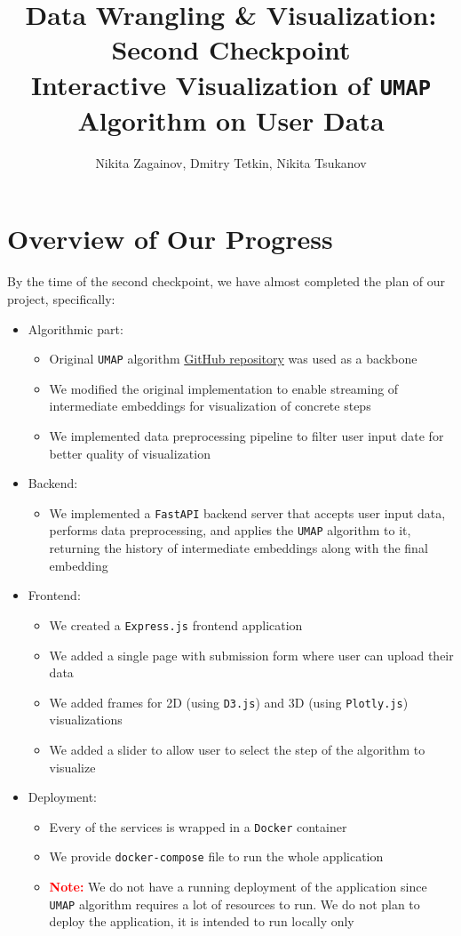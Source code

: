 \documentclass{article}
\title{Data Wrangling \& Visualization: Second Checkpoint \\
 \textbf{Interactive Visualization of \texttt{UMAP} Algorithm on User Data}}
\author{Nikita Zagainov, Dmitry Tetkin, Nikita Tsukanov}
\date{\monthname[\the\month] \the\year}
\begin{document}
\maketitle

\section{Overview of Our Progress}

By the time of the second checkpoint, we have almost completed the plan of our project, specifically:
\begin{itemize}
	\item Algorithmic part:
	      \begin{itemize}
		      \item Original \texttt{UMAP} algorithm \href{https://github.com/lmcinnes/umap}{GitHub repository} was used as a backbone
		      \item We modified the original implementation to enable streaming of intermediate embeddings for visualization of concrete steps
		      \item We implemented data preprocessing pipeline to filter user input date for better quality of visualization
	      \end{itemize}
	\item Backend:
	      \begin{itemize}
		      \item We implemented a \texttt{FastAPI} backend server that accepts user input data, performs data preprocessing, and applies the \texttt{UMAP} algorithm to it, returning the history of intermediate embeddings along with the final embedding

	      \end{itemize}
	\item Frontend:
	      \begin{itemize}
		      \item We created a \texttt{Express.js} frontend application
		      \item We added a single page with submission form where user can upload their data
		      \item We added frames for 2D (using \texttt{D3.js}) and 3D (using \texttt{Plotly.js}) visualizations
		      \item We added a slider to allow user to select the step of the algorithm to visualize
	      \end{itemize}
	\item Deployment:
	      \begin{itemize}
		      \item Every of the services is wrapped in a \texttt{Docker} container
		      \item We provide \texttt{docker-compose} file to run the whole application
			  \item \textcolor{red}{\textbf{Note:}} We do not have a running deployment of the application since \texttt{UMAP} algorithm requires a lot of resources to run. We do not plan to deploy the application, it is intended to run locally only
	      \end{itemize}
\end{itemize}
\end{document}
